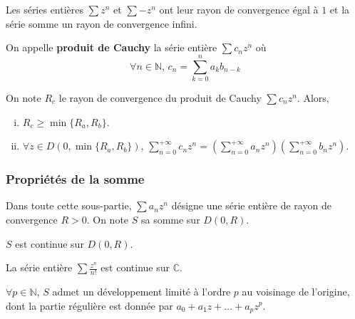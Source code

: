 
	\begin{example}
		Les séries entières $\sum z^n$ et $\sum -z^n$ ont leur rayon de convergence égal à $1$ et la série somme un rayon de convergence infini.
	\end{example}


	\begin{definition}
		On appelle \textbf{produit de Cauchy} la série entière $\sum c_n z^n$ où
		\[ \forall n \in \mathbb{N}, \, c_n = \sum_{k=0}^n a_k b_{n-k} \]
	\end{definition}

	\begin{proposition}
		On note $R_{c}$ le rayon de convergence du produit de Cauchy $\sum c_n z^n$. Alors,
		\begin{enumerate}[(i)]
			\item $R_c \geq \min \{R_a, R_b\}$.
			\item $\forall z \in D(0, \min \{R_a, R_b\}), \, \sum_{n = 0}^{+\infty} c_n z^n = (\sum_{n = 0}^{+\infty} a_n z^n) (\sum_{n = 0}^{+\infty} b_n z^n)$.
		\end{enumerate}
	\end{proposition}

	\subsubsection{Propriétés de la somme}


	Dans toute cette sous-partie, $\sum a_n z^n$ désigne une série entière de rayon de convergence $R > 0$. On note $S$ sa somme sur $D(0,R)$.

	\begin{proposition}
		$S$ est continue sur $D(0,R)$.
	\end{proposition}

	\begin{example}
		La série entière $\sum \frac{z^n}{n!}$ est continue sur $\mathbb{C}$.
	\end{example}

	\begin{corollary}
		$\forall p \in \mathbb{N}$, $S$ admet un développement limité à l'ordre $p$ au voisinage de l'origine, dont la partie régulière est donnée par $a_0 + a_1z + \dots + a_pz^p$.
	\end{corollary}

